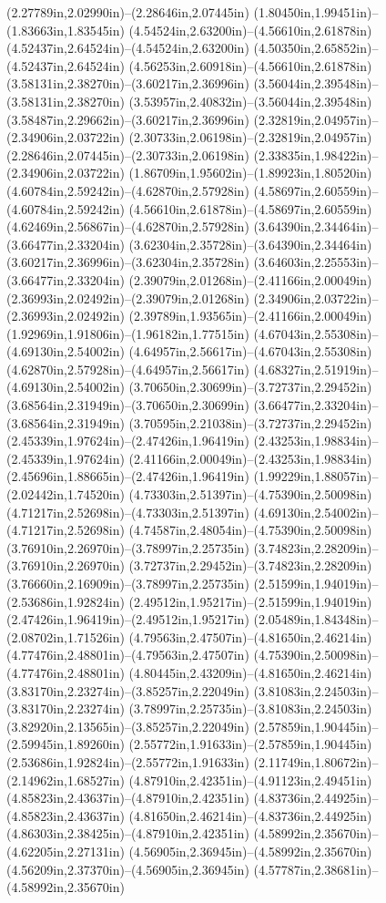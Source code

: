 (2.27789in,2.02990in)--(2.28646in,2.07445in) (1.80450in,1.99451in)--(1.83663in,1.83545in) (4.54524in,2.63200in)--(4.56610in,2.61878in) (4.52437in,2.64524in)--(4.54524in,2.63200in) (4.50350in,2.65852in)--(4.52437in,2.64524in) (4.56253in,2.60918in)--(4.56610in,2.61878in) (3.58131in,2.38270in)--(3.60217in,2.36996in) (3.56044in,2.39548in)--(3.58131in,2.38270in) (3.53957in,2.40832in)--(3.56044in,2.39548in) (3.58487in,2.29662in)--(3.60217in,2.36996in) (2.32819in,2.04957in)--(2.34906in,2.03722in) (2.30733in,2.06198in)--(2.32819in,2.04957in) (2.28646in,2.07445in)--(2.30733in,2.06198in) (2.33835in,1.98422in)--(2.34906in,2.03722in) (1.86709in,1.95602in)--(1.89923in,1.80520in) (4.60784in,2.59242in)--(4.62870in,2.57928in) (4.58697in,2.60559in)--(4.60784in,2.59242in) (4.56610in,2.61878in)--(4.58697in,2.60559in) (4.62469in,2.56867in)--(4.62870in,2.57928in) (3.64390in,2.34464in)--(3.66477in,2.33204in) (3.62304in,2.35728in)--(3.64390in,2.34464in) (3.60217in,2.36996in)--(3.62304in,2.35728in) (3.64603in,2.25553in)--(3.66477in,2.33204in) (2.39079in,2.01268in)--(2.41166in,2.00049in) (2.36993in,2.02492in)--(2.39079in,2.01268in) (2.34906in,2.03722in)--(2.36993in,2.02492in) (2.39789in,1.93565in)--(2.41166in,2.00049in) (1.92969in,1.91806in)--(1.96182in,1.77515in) (4.67043in,2.55308in)--(4.69130in,2.54002in) (4.64957in,2.56617in)--(4.67043in,2.55308in) (4.62870in,2.57928in)--(4.64957in,2.56617in) (4.68327in,2.51919in)--(4.69130in,2.54002in) (3.70650in,2.30699in)--(3.72737in,2.29452in) (3.68564in,2.31949in)--(3.70650in,2.30699in) (3.66477in,2.33204in)--(3.68564in,2.31949in) (3.70595in,2.21038in)--(3.72737in,2.29452in) (2.45339in,1.97624in)--(2.47426in,1.96419in) (2.43253in,1.98834in)--(2.45339in,1.97624in) (2.41166in,2.00049in)--(2.43253in,1.98834in) (2.45696in,1.88665in)--(2.47426in,1.96419in) (1.99229in,1.88057in)--(2.02442in,1.74520in) (4.73303in,2.51397in)--(4.75390in,2.50098in) (4.71217in,2.52698in)--(4.73303in,2.51397in) (4.69130in,2.54002in)--(4.71217in,2.52698in) (4.74587in,2.48054in)--(4.75390in,2.50098in) (3.76910in,2.26970in)--(3.78997in,2.25735in) (3.74823in,2.28209in)--(3.76910in,2.26970in) (3.72737in,2.29452in)--(3.74823in,2.28209in) (3.76660in,2.16909in)--(3.78997in,2.25735in) (2.51599in,1.94019in)--(2.53686in,1.92824in) (2.49512in,1.95217in)--(2.51599in,1.94019in) (2.47426in,1.96419in)--(2.49512in,1.95217in) (2.05489in,1.84348in)--(2.08702in,1.71526in) (4.79563in,2.47507in)--(4.81650in,2.46214in) (4.77476in,2.48801in)--(4.79563in,2.47507in) (4.75390in,2.50098in)--(4.77476in,2.48801in) (4.80445in,2.43209in)--(4.81650in,2.46214in) (3.83170in,2.23274in)--(3.85257in,2.22049in) (3.81083in,2.24503in)--(3.83170in,2.23274in) (3.78997in,2.25735in)--(3.81083in,2.24503in) (3.82920in,2.13565in)--(3.85257in,2.22049in) (2.57859in,1.90445in)--(2.59945in,1.89260in) (2.55772in,1.91633in)--(2.57859in,1.90445in) (2.53686in,1.92824in)--(2.55772in,1.91633in) (2.11749in,1.80672in)--(2.14962in,1.68527in) (4.87910in,2.42351in)--(4.91123in,2.49451in) (4.85823in,2.43637in)--(4.87910in,2.42351in) (4.83736in,2.44925in)--(4.85823in,2.43637in) (4.81650in,2.46214in)--(4.83736in,2.44925in) (4.86303in,2.38425in)--(4.87910in,2.42351in) (4.58992in,2.35670in)--(4.62205in,2.27131in) (4.56905in,2.36945in)--(4.58992in,2.35670in) (4.56209in,2.37370in)--(4.56905in,2.36945in) (4.57787in,2.38681in)--(4.58992in,2.35670in) 